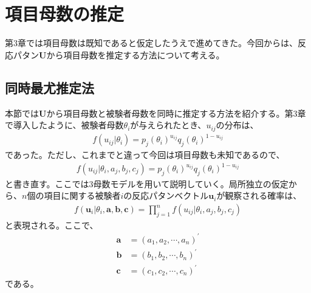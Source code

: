 \documentclass[12pt]{jarticle}
\begin{document}
\section{項目母数の推定}
第$3$章では項目母数は既知であると仮定したうえで進めてきた。今回からは、反応パタン$\boldsymbol U$から項目母数を推定する方法について考える。
\subsection{同時最尤推定法}
本節では$\boldsymbol U$から項目母数と被験者母数を同時に推定する方法を紹介する。第$3$章で導入したように、被験者母数$\theta_i$が与えられたとき、$u_{ij}$の分布は、
\begin{align}
  \label{03}
  \displaystyle f(u_{ij}|\theta_i) = p_j(\theta_i)^{u_{ij}}q_j(\theta_i)^{1-u_{ij}} \tag{4.1}
\end{align}
であった。ただし、これまでと違って今回は項目母数も未知であるので、
\begin{align}
  \label{04}
  \displaystyle f(u_{ij}|\theta_i,a_j,b_j,c_j) = p_j(\theta_i)^{u_{ij}}q_j(\theta_i)^{1-u_{ij}} \tag{4.2}
\end{align}
と書き直す。ここでは$3$母数モデルを用いて説明していく。局所独立の仮定から、$n$個の項目に関する被験者$i$の反応パタンベクトル$\boldsymbol u_i$が観察される確率は、
\begin{align}
  \label{05}
  \displaystyle f(\boldsymbol u_i|\theta_i,\boldsymbol a,\boldsymbol  b,\boldsymbol  c) = \prod_{j = 1}^{n} f(u_{ij}|\theta_i,a_j,b_j,c_j) \tag{4.3}
\end{align}
と表現される。ここで、
\begin{align}
  \label{06}
  \displaystyle \boldsymbol{a}&=(a_1,a_2,\cdots,a_n)^{\prime} \tag{4.4}\\
  \boldsymbol{b}&= (b_1,b_2,\cdots,b_n)^{\prime}\tag{4.5}\\
  \boldsymbol{c}&= (c_1,c_2,\cdots,c_n)^{\prime}\tag{4.6}
\end{align}
である。
\end{document}
